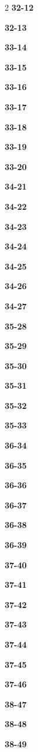 \documentclass[10pt,a4paper]{article}
\begin{document}
\begin{multicols}{2}
\noindent\textbf{32-12}\ \par
\noindent\textbf{32-13}\ \par
\noindent\textbf{33-14}\ \par
\noindent\textbf{33-15}\ \par
\noindent\textbf{33-16}\ \par
\noindent\textbf{33-17}\ \par
\noindent\textbf{33-18}\ \par
\noindent\textbf{33-19}\ \par
\noindent\textbf{33-20}\ \par
\noindent\textbf{34-21}\ \par
\noindent\textbf{34-22}\ \par
\noindent\textbf{34-23}\ \par
\noindent\textbf{34-24}\ \par
\noindent\textbf{34-25}\ \par
\noindent\textbf{34-26}\ \par
\noindent\textbf{34-27}\ \par
\noindent\textbf{35-28}\ \par
\noindent\textbf{35-29}\ \par
\noindent\textbf{35-30}\ \par
\noindent\textbf{35-31}\ \par
\noindent\textbf{35-32}\ \par
\noindent\textbf{35-33}\ \par
\noindent\textbf{36-34}\ \par
\noindent\textbf{36-35}\ \par
\noindent\textbf{36-36}\ \par
\noindent\textbf{36-37}\ \par
\noindent\textbf{36-38}\ \par
\noindent\textbf{36-39}\ \par
\noindent\textbf{37-40}\ \par
\noindent\textbf{37-41}\ \par
\noindent\textbf{37-42}\ \par
\noindent\textbf{37-43}\ \par
\noindent\textbf{37-44}\ \par
\noindent\textbf{37-45}\ \par
\noindent\textbf{37-46}\ \par
\noindent\textbf{38-47}\ \par
\noindent\textbf{38-48}\ \par
\noindent\textbf{38-49}\ \par

\end{multicols}
\end{document}

